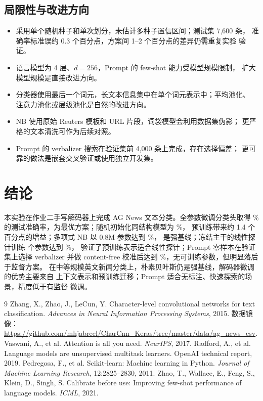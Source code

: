 \documentclass[UTF8,a4paper,zihao=-4,fontset=none]{ctexart}
\begin{document}
\subsection{局限性与改进方向}
\begin{itemize}
  \item 采用单个随机种子和单次划分，未估计多种子置信区间；测试集 7,600 条，
        准确率标准误约 0.3 个百分点，方案间 1--2 个百分点的差异仍需重复实验
        验证。
  \item 语言模型为 4 层、$d=256$，Prompt 的 few-shot 能力受模型规模限制，
        扩大模型规模是直接改进方向。
  \item 分类器使用最后一个词元，长文本信息集中在单个词元表示中；平均池化、
        注意力池化或层级池化是自然的改进方向。
  \item NB 使用原始 Reuters 模板和 URL 片段，词袋模型会利用数据集伪影；
        更严格的文本清洗可作为后续对照。
  \item Prompt 的 verbalizer 搜索在验证集前 4,000 条上完成，存在选择偏差；
        更可靠的做法是嵌套交叉验证或使用独立开发集。
\end{itemize}

\section{结论}
本实验在作业二手写解码器上完成 AG News 文本分类。全参数微调分类头取得
\FullAcc\% 的测试准确率，为最优方案；随机初始化同结构模型为 \ScratchAcc\%，
预训练带来约 1.4 个百分点的增益；多项式 NB 以 0.8M 参数达到 \NBAcc\%，
是强基线；冻结主干的线性探针训练 \FullHead{} 个参数达到 \FrozenAcc\%，
验证了预训练表示适合线性探针；Prompt 零样本在验证集上选择 verbalizer 并做
content-free 校准后达到 \PromptAcc\%，无可训练参数，但明显落后于监督方案。
在中等规模英文新闻分类上，朴素贝叶斯仍是强基线，解码器微调的优势主要来自
上下文表示和预训练迁移；Prompt 适合无标注、快速探索的场景，精度低于有监督
微调。

\begin{thebibliography}{9}
 Zhang, X., Zhao, J., LeCun, Y. Character-level convolutional
networks for text classification. \emph{Advances in Neural Information Processing
Systems}, 2015. 数据镜像：
\url{https://github.com/mhjabreel/CharCnn_Keras/tree/master/data/ag_news_csv}.
 Vaswani, A., et al. Attention is all you need.
\emph{NeurIPS}, 2017.
 Radford, A., et al. Language models are unsupervised
multitask learners. OpenAI technical report, 2019.
 Pedregosa, F., et al. Scikit-learn: Machine learning in
Python. \emph{Journal of Machine Learning Research}, 12:2825--2830, 2011.
 Zhao, T., Wallace, E., Feng, S., Klein, D., Singh, S.
Calibrate before use: Improving few-shot performance of language models.
\emph{ICML}, 2021.
\end{thebibliography}
\end{document}
